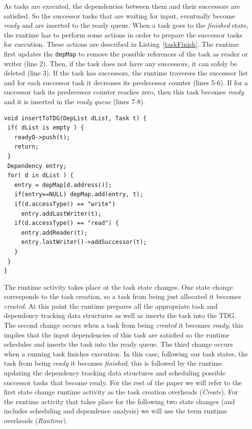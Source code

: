 As tasks are executed, the dependencies between them and their successors are satisfied. 
So the successor tasks that are waiting for input, eventually become \textit{ready} and are inserted to the ready queue.
When a task goes to the \textit{finished} state, the runtime has to perform some actions in order to prepare the successor tasks for execution.
These actions are described in Listing~\ref{taskFinish}.
The runtime first updates the \texttt{depMap} to remove the possible references of the task as reader or writer (line 2).
Then, if the task does not have any successors, it can safely be deleted (line 3).
If the task has successors, the runtime traverses the successor list and for each successor task it decreases its predecessor counter (lines 5-6).
If for a successor task its predecessor counter reaches zero, then this task becomes \textit{ready} and it is inserted in the \textit{ready queue} (lines 7-8).
\begin{lstlisting}[float, emph={is, void,if,return,Dependency,DepList,Data,Task,not,for,true,and,break}, captionpos=b, caption={Pseudo-code for TDG insertion},label=insertTDG, emph={[2]mat}, emphstyle={[2]}, aboveskip={0\baselineskip}, frame=tb, belowskip={0\baselineskip}]
void insertToTDG(DepList dList, Task t) {
 if( dList is empty ) {
   readyQ->push(t);
   return;
 }
 Dependency entry;
 for( d in dList ) {
   entry = depMap[d.address()];
   if(entry==NULL) depMap.add(entry, t);
   if(d.accessType() == "write")
     entry.addLastWriter(t);
   if(d.accessType() == "read") {
     entry.addReader(t);
     entry.lastWriter()->addSuccessor(t);
   }
 }
}
\end{lstlisting}
The runtime activity takes place at the task state changes. 
One state change corresponds to the task creation, so a task from being just allocated it becomes \textit{created}. 
At this point the runtime prepares all the appropriate task and dependency tracking data structures as well as inserts the task into the TDG.
The second change occurs when a task from being \textit{created} it becomes \textit{ready};
this implies that the input dependencies of this task are satisfied so the runtime schedules and inserts the task into the ready queue.
The third change occurs when a running task finishes execution. 
In this case, following our task states, the task from being \textit{ready} it becomes \textit{finished}; this is followed by the runtime updating the dependency tracking data structures and scheduling possible successor tasks that become ready. 
For the rest of the paper we will refer to the first state change runtime activity as the task creation overheads (\textit{Create}).
For the runtime activity that takes place for the following two state changes (and includes scheduling and dependence analysis) we will use the term runtime overheads (\textit{Runtime}).



